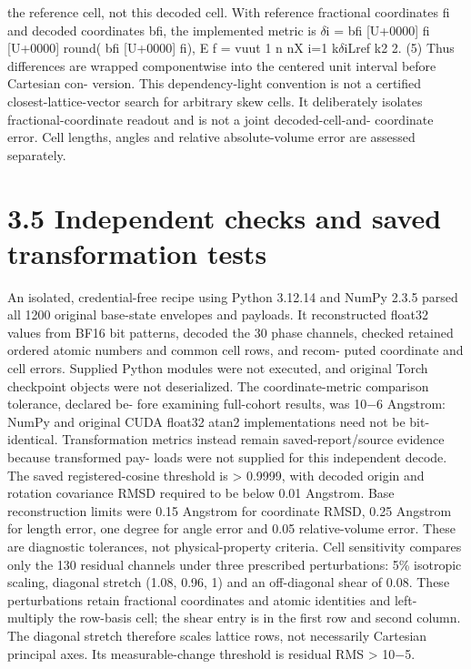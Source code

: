 \documentclass[11pt]{article}
\begin{document}
the reference cell, not this decoded cell. With reference fractional coordinates fi and decoded
coordinates bfi, the implemented metric is
\ensuremath{\delta}i = bfi [U+0000] fi [U+0000] round( bfi [U+0000] fi), E f =
vuut 1
n
nX
i=1
k\ensuremath{\delta}iLref k2
2. (5)
Thus differences are wrapped componentwise into the centered unit interval before Cartesian con-
version. This dependency-light convention is not a certified closest-lattice-vector search for arbitrary
skew cells. It deliberately isolates fractional-coordinate readout and is not a joint decoded-cell-and-
coordinate error. Cell lengths, angles and relative absolute-volume error are assessed separately.

\section*{3.5 Independent checks and saved transformation tests}

An isolated, credential-free recipe using Python 3.12.14 and NumPy 2.3.5 parsed all 1200 original
base-state envelopes and payloads. It reconstructed float32 values from BF16 bit patterns, decoded
the 30 phase channels, checked retained ordered atomic numbers and common cell rows, and recom-
puted coordinate and cell errors. Supplied Python modules were not executed, and original Torch
checkpoint objects were not deserialized. The coordinate-metric comparison tolerance, declared be-
fore examining full-cohort results, was 10\ensuremath{-}6 Angstrom: NumPy and original CUDA float32 atan2
implementations need not be bit-identical.
Transformation metrics instead remain saved-report/source evidence because transformed pay-
loads were not supplied for this independent decode. The saved registered-cosine threshold is
> 0.9999, with decoded origin and rotation covariance RMSD required to be below 0.01 Angstrom.
Base reconstruction limits were 0.15 Angstrom for coordinate RMSD, 0.25 Angstrom for length
error, one degree for angle error and 0.05 relative-volume error. These are diagnostic tolerances,
not physical-property criteria. Cell sensitivity compares only the 130 residual channels under three
prescribed perturbations: 5\% isotropic scaling, diagonal stretch (1.08, 0.96, 1) and an off-diagonal
shear of 0.08. These perturbations retain fractional coordinates and atomic identities and left-
multiply the row-basis cell; the shear entry is in the first row and second column. The diagonal
stretch therefore scales lattice rows, not necessarily Cartesian principal axes. Its measurable-change
threshold is residual RMS > 10\ensuremath{-}5.
\end{document}
